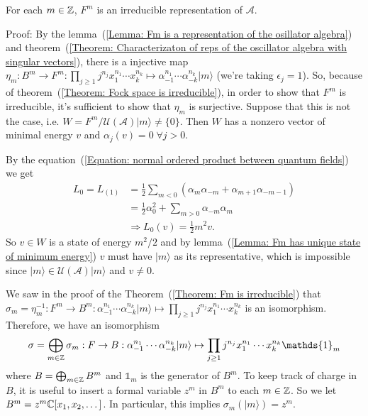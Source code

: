 \begin{dang}
    \begin{theorem}\cite{kac2013bombay}\label{Theorem: Fm is irreducible}
        For each $m\in\mathbb{Z}$, $F^m$ is an irreducible representation of $\mathcal{A}$.
    \end{theorem}
\end{dang}
Proof: By the lemma~(\ref{Lemma: Fm is a representation of the osillator algebra}) and theorem~(\ref{Theorem: Characterizaton of reps of the oscillator algebra with singular vectors}), there is a injective map $\eta_m:B^m\rightarrow F^m:\prod_{j\geq1}j^{n_j}x_1^{n_1}\cdots x_k^{n_k}\mapsto \alpha_{-1}^{n_1}\cdots \alpha_{-k}^{n_k}|m\rangle$ (we're taking $\epsilon_j=1$). So, because of theorem~(\ref{Theorem: Fock space is irreducible}), in order to show that $F^m$ is irreducible, it's sufficient to show that $\eta_m$ is surjective. Suppose that this is not the case, i.e. $W=F^m/\mathcal{U}(\mathcal{A})|m\rangle\neq\{0\}$. Then $W$ has a nonzero vector of minimal energy $v$ and $\alpha_j(v)=0\;\forall j>0$.\par
By the equation~(\ref{Equation: normal ordered product between quantum fields}) we get 
\begin{equation}
\begin{split}
    L_0=L_{(1)}&=\frac{1}{2}\sum_{m<0}(\alpha_m\alpha_{-m}+\alpha_{m+1}\alpha_{-m-1})\\
    &=\frac{1}{2}\alpha_0^2+\sum_{m>0}\alpha_{-m}\alpha_m\\
    &\Rightarrow L_0(v)=\frac{1}{2}m^2 v.
\end{split}
\end{equation}
So $v\in W$ is a state of energy $m^2/2$ and by lemma~(\ref{Lemma: Fm has unique state of minimum energy}) $v$ must have $|m\rangle$ as its representative, which is impossible since $|m\rangle \in \mathcal{U}(\mathcal{A})|m\rangle$ and $v\neq0$.
\begin{dang}
    \begin{notation}\label{Notation: isomorphism sigma from F to B}
        We saw in the proof of the Theorem~(\ref{Theorem: Fm is irreducible}) that $\sigma_m=\eta_m^{-1}: F^m\rightarrow B^m: \alpha_{-1}^{n_1}\cdots \alpha_{-k}^{n_k}|m\rangle \mapsto \prod_{j\geq1}j^{n_j}x_1^{n_1}\cdots x_k^{n_k} $ is an isomorphism. Therefore, we have an isomorphism
\begin{equation}
    \sigma=\bigoplus_{m\in\bb{Z}}\sigma_m: F \rightarrow B: \alpha_{-1}^{n_1}\cdots \alpha_{-k}^{n_k}|m\rangle \mapsto \prod_{j\geq1}j^{n_j}x_1^{n_1}\cdots x_k^{n_k}\mathds{1}_m
\end{equation}
where $B=\bigoplus_{m\in\mathbb{Z}}B^m$ and $\mathds{1}_m$ is the generator of $B^m$. To keep track of charge in $B$, it is useful to insert a formal variable $z^m$ in $B^m$ to each $m\in\mathbb{Z}$. So we let $B^m=z^m\mathbb{C}[x_1,x_2,\dots]$. In particular, this implies $\sigma_m(|m\rangle)=z^m$. 
    \end{notation}
\end{dang}



